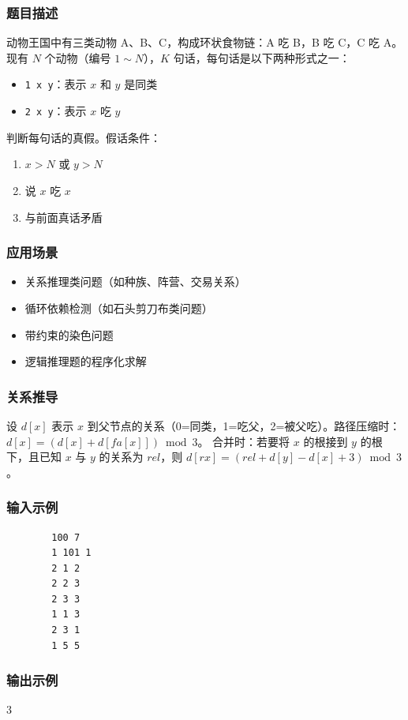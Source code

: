 \documentclass[12pt,a4paper]{ctexart}
\begin{document}
	\subsubsection*{题目描述}
	动物王国中有三类动物 A、B、C，构成环状食物链：A 吃 B，B 吃 C，C 吃 A。
	现有 $N$ 个动物（编号 $1\sim N$），$K$ 句话，每句话是以下两种形式之一：
	\begin{itemize}
		\item \texttt{1 x y}：表示 $x$ 和 $y$ 是同类
		\item \texttt{2 x y}：表示 $x$ 吃 $y$
	\end{itemize}
	
	判断每句话的真假。假话条件：
	\begin{enumerate}
		\item $x>N$ 或 $y>N$
		\item 说 $x$ 吃 $x$
		\item 与前面真话矛盾
	\end{enumerate}
	
	\subsubsection*{应用场景}
	\begin{itemize}
		\item 关系推理类问题（如种族、阵营、交易关系）
		\item 循环依赖检测（如石头剪刀布类问题）
		\item 带约束的染色问题
		\item 逻辑推理题的程序化求解
	\end{itemize}
	
	\subsubsection*{关系推导}
	设 $d[x]$ 表示 $x$ 到父节点的关系（0=同类，1=吃父，2=被父吃）。路径压缩时：$d[x] = (d[x] + d[fa[x]]) \bmod 3$。  
	合并时：若要将 $x$ 的根接到 $y$ 的根下，且已知 $x$ 与 $y$ 的关系为 $rel$，则 $d[rx] = (rel + d[y] - d[x] + 3) \bmod 3$。
	
	\subsubsection*{输入示例}
	\begin{verbatim}
		100 7
		1 101 1
		2 1 2
		2 2 3
		2 3 3
		1 1 3
		2 3 1
		1 5 5
	\end{verbatim}
	
	\subsubsection*{输出示例}
	3
	
\end{document}
